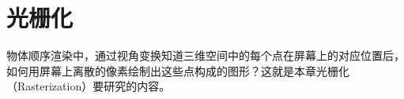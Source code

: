 \chapter{光栅化}
物体顺序渲染中，通过视角变换知道三维空间中的每个点在屏幕上的对应位置后，如何用屏幕上离散的像素绘制出这些点构成的图形？这就是本章光栅化（Rasterization）要研究的内容。





